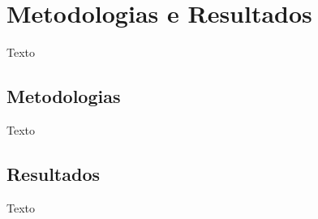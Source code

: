 \chapter{Metodologias e Resultados}

Texto

\section{Metodologias}

Texto

\section{Resultados}

Texto

